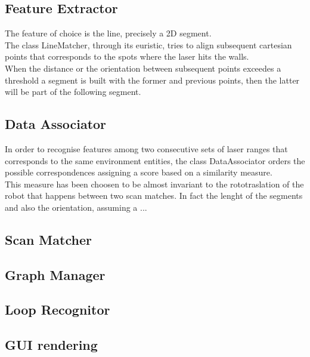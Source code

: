 \subsection{ Feature Extractor}
The feature of choice is the line, precisely a 2D segment.\\ The class LineMatcher, through its euristic, tries to align subsequent cartesian points that corresponds to the spots where the laser hits the walls.\\ When the distance or the orientation between subsequent points exceedes a threshold a segment is built with the former and previous points, then the latter will be part of the following segment.
\subsection{ Data Associator}
In order to recognise features among two consecutive sets of laser ranges that corresponds to the same environment entities, the class DataAssociator orders the possible correspondences assigning a score based on a similarity measure.\\
This measure has been choosen  to be almost invariant to the rototraslation  of the robot that happens between two scan matches. In fact the lenght of the segments and  also the orientation, assuming a ...
\subsection{ Scan Matcher }
\subsection{ Graph Manager}
\subsection{ Loop Recognitor}
\subsection{ GUI rendering}
